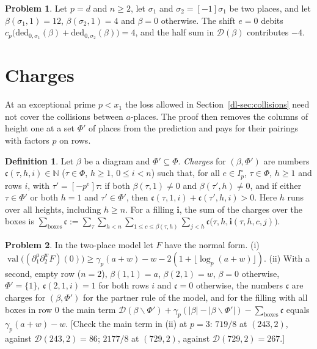 \documentclass[reqno]{amsart}
\theoremstyle{plain}
\theoremstyle{definition}
\newtheorem{problem}{Problem}[section]
\newtheorem{definition}[theorem]{Definition}
\theoremstyle{remark}
\newcommand{\N}{\mathbb{N}}
\newcommand{\val}{\operatorname{val}}
\newcommand{\Dc}{\mathcal{D}}
\newcommand{\ch}{\mathfrak{c}}
\newcommand{\bi}{\mathbf{i}}
\begin{document}
\begin{problem}\label{pr:zero-shift}
Let \(p = d\) and \(n \ge 2\), let \(\sigma_1\) and \(\sigma_2 = [-1]\sigma_1\) be two places, and let \(\beta(\sigma_1, 1) = 12\), \(\beta(\sigma_2, 1) = 4\) and \(\beta = 0\) otherwise.  The shift \(e = 0\) debits \(c_p\bigl(\mathrm{ded}_{0, \sigma_1}(\beta) + \mathrm{ded}_{0, \sigma_2}(\beta)\bigr) = 4\), and the half sum in \(\Dc(\beta)\) contributes \(-4\).
\end{problem}

\section{Charges}\label{sec:charges}

At an exceptional prime \(p < x_1\) the loss allowed in Section~\ref{dl-sec:collisions} need not cover the collisions between \(a\)-places.  The proof then removes the columns of height one at a set \(\Phi'\) of places from the prediction and pays for their pairings with factors \(p\) on rows.

\begin{definition}\label{def:charges}
Let \(\beta\) be a diagram and \(\Phi' \subseteq \Phi\).  \emph{Charges} for \((\beta, \Phi')\) are numbers \(\ch(\tau, h, i) \in \N\) (\(\tau \in \Phi\), \(h \ge 1\), \(0 \le i < n\)) such that, for all \(e \in I_p^\circ\), \(\tau \in \Phi\), \(h \ge 1\) and rows \(i\), with \(\tau' = [-p^e]\tau\):
if both \(\beta(\tau, 1) \ne 0\) and \(\beta(\tau', h) \ne 0\), and if either \(\tau \in \Phi'\) or both \(h = 1\) and \(\tau' \in \Phi'\), then \(\ch(\tau, 1, i) + \ch(\tau', h, i) > 0\).  Here \(h\) runs over all heights, including \(h \ge n\).
For a filling \(\bi\), the sum of the charges over the boxes is
\(
  \sum_{\text{boxes}} \ch := \sum_{\tau} \sum_{h < n} \sum_{1 \le c \le \beta(\tau, h)} \sum_{j < h} \ch\bigl(\tau, h, \bi(\tau, h, c, j)\bigr) .
\)
\end{definition}

\begin{problem}\label{pr:model-charges}
In the two-place model let \(F\) have the normal form.
(i) \(\val\bigl((\partial_1^a \partial_2^w F)(0)\bigr) \ge \gamma_p(a + w) - w - 2(1 + \lfloor \log_p(a+w) \rfloor)\).
(ii) With a second, empty row (\(n = 2\)), \(\beta(1,1) = a\), \(\beta(2,1) = w\), \(\beta = 0\) otherwise, \(\Phi' = \{1\}\), \(\ch(2, 1, i) = 1\) for both rows \(i\) and \(\ch = 0\) otherwise, the numbers \(\ch\) are charges for \((\beta, \Phi')\) for the partner rule of the model, and for the filling with all boxes in row \(0\) the main term \(\Dc(\beta \smallsetminus \Phi') + \gamma_p(\lvert\beta\rvert - \lvert\beta \smallsetminus \Phi'\rvert) - \sum_{\text{boxes}} \ch\) equals \(\gamma_p(a + w) - w\).
[Check the main term in (ii) at \(p = 3\): \(719/8\) at \((243, 2)\), against \(\Dc(243, 2) = 86\); \(2177/8\) at \((729, 2)\), against \(\Dc(729, 2) = 267\).]
\end{problem}
\end{document}

